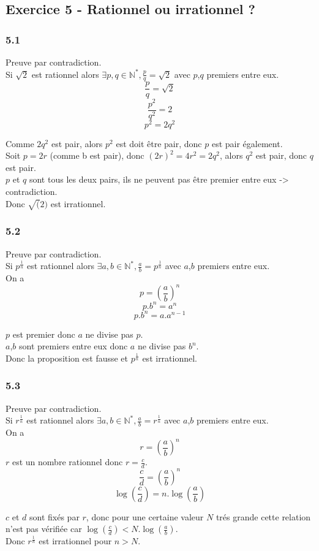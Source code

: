 \documentclass[]{book}
\theoremstyle{definition}
\newcommand{\bb}[1]{\mathbb{#1}}
\newcommand{\N}{\bb{N}}
\begin{document}
\subsection*{Exercice 5 - Rationnel ou irrationnel ?}
\subsubsection*{5.1}
Preuve par contradiction.\\

Si $\sqrt{2}$ est rationnel alors $\exists p, q \in \N^{*}, \frac{p}{q}=\sqrt{2}$ avec $p$,$q$ premiers entre eux.
$$\frac{p}{q}=\sqrt{2}$$
$$\frac{p^2}{q^2}=2$$
$$p^2=2q^2$$

Comme $2q^2$ est pair, alors $p^2$ est doit \^etre pair, donc $p$ est pair \'egalement.\\
Soit $p=2r$ (comme b est pair), donc $(2r)^2 = 4r^2 = 2q^2$, alors $q^2$ est pair, donc $q$ est pair.\\
$p$ et $q$ sont tous les deux pairs, ils ne peuvent pas \^etre premier entre eux -> contradiction.\\
Donc $\sqrt(2)$ est irrationnel. 

\subsubsection*{5.2}
Preuve par contradiction.\\

Si $p^{\frac{1}{n}}$ est rationnel alors  $\exists a, b \in \N^{*}, \frac{a}{b}=p^{\frac{1}{n}}$ avec $a$,$b$ premiers entre eux.\\
On a 
$$p = (\frac{a}{b})^{n}$$
$$p.b^{n} = a^{n}$$
$$p.b^{n} = a.a^{n-1}$$

$p$ est premier donc $a$ ne divise pas $p$.\\
$a$,$b$ sont premiers entre eux donc $a$ ne divise pas $b^n$.\\
Donc la proposition est fausse et $p^{\frac{1}{n}}$ est irrationnel.

\subsubsection*{5.3}
Preuve par contradiction.\\
Si $r^{\frac{1}{n}}$ est rationnel alors  $\exists a, b \in \N^{*}, \frac{a}{b}=r^{\frac{1}{n}}$ avec $a$,$b$ premiers entre eux.\\
On a 
$$r = \left(\frac{a}{b}\right)^{n}$$
$r$ est un nombre rationnel donc $r=\frac{c}{d}$.
$$\frac{c}{d} = \left(\frac{a}{b}\right)^{n}$$
$$\log\left(\frac{c}{d}\right) = n.\log\left(\frac{a}{b}\right)$$

$c$ et $d$ sont fix\'es par $r$, donc pour une certaine valeur $N$ tr\'es grande cette relation n'est pas v\'erifi\'ee car $\log\left(\frac{c}{d}\right) < N.\log\left(\frac{a}{b}\right)$.\\
Donc $r^{\frac{1}{n}}$ est irrationnel pour $n>N$.
\end{document}
